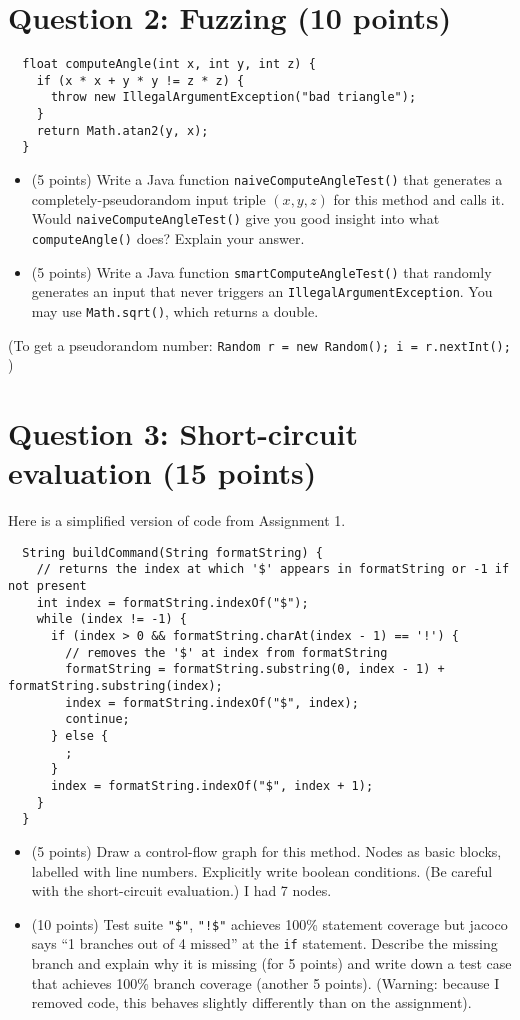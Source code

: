 \documentclass[12pt]{article}
\begin{document}
\section*{Question 2: Fuzzing (10 points)}
\begin{lstlisting}
  float computeAngle(int x, int y, int z) {
    if (x * x + y * y != z * z) {
      throw new IllegalArgumentException("bad triangle");
    }
    return Math.atan2(y, x);
  }
\end{lstlisting}
\begin{itemize}[noitemsep]
\item (5 points) Write a Java function {\tt naiveComputeAngleTest()} that generates a completely-pseudorandom input triple $(x, y, z)$ for this method and calls it. Would {\tt naiveComputeAngleTest()} give you good insight
  into what {\tt computeAngle()} does? Explain your answer.
\item (5 points) Write a Java function {\tt smartComputeAngleTest()} that randomly generates an input that never triggers an {\tt IllegalArgumentException}. You may use {\tt Math.sqrt()}, which returns a double.
\end{itemize}
(To get a pseudorandom number: {\tt Random r = new Random(); i = r.nextInt(); })

\newpage
\section*{Question 3: Short-circuit evaluation (15 points)}
Here is a simplified version of code from Assignment 1.
\begin{lstlisting}
  String buildCommand(String formatString) {
    // returns the index at which '$' appears in formatString or -1 if not present
    int index = formatString.indexOf("$");
    while (index != -1) {
      if (index > 0 && formatString.charAt(index - 1) == '!') {
        // removes the '$' at index from formatString
        formatString = formatString.substring(0, index - 1) + formatString.substring(index);
        index = formatString.indexOf("$", index);
        continue;
      } else {
        ;
      }
      index = formatString.indexOf("$", index + 1);
    }
  }
\end{lstlisting}
\begin{itemize}[noitemsep]
\item (5 points) Draw a control-flow graph for this method. Nodes as basic blocks, labelled with line
  numbers. Explicitly write boolean conditions. (Be careful with the short-circuit evaluation.) I had 7 nodes.
\item (10 points) Test suite \verb+"$"+, \verb+"!$"+ achieves 100\%
  statement coverage but jacoco says ``1 branches out of 4 missed'' at
  the {\tt if} statement. Describe the missing branch and explain why
  it is missing (for 5 points) and write down a test case that achieves 100\%
  branch coverage (another 5 points). (Warning: because I removed code, this behaves
  slightly differently than on the assignment).
\end{itemize}
\end{document}
